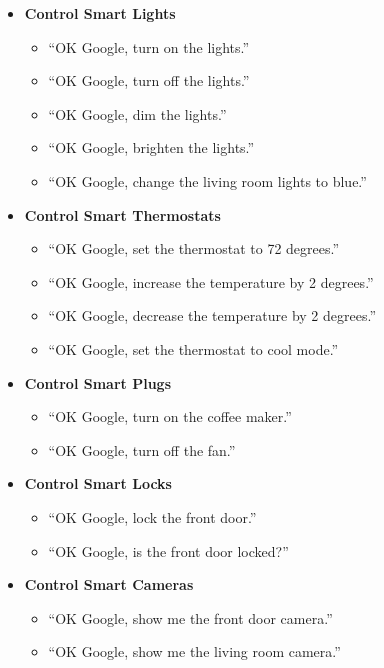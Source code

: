 \documentclass[
  jou,
  floatsintext,
  longtable,
  a4paper,
  nolmodern,
  notxfonts,
  notimes,
  12pt,
  colorlinks=true,linkcolor=blue,citecolor=blue,urlcolor=blue]{apa7}
\providecommand{\tightlist}{%
  \setlength{\itemsep}{0pt}\setlength{\parskip}{0pt}}
\begin{document}
\begin{itemize}
\tightlist
\item
  \textbf{Control Smart Lights}

  \begin{itemize}
  \tightlist
  \item
    ``OK Google, turn on the lights.''
  \item
    ``OK Google, turn off the lights.''
  \item
    ``OK Google, dim the lights.''
  \item
    ``OK Google, brighten the lights.''
  \item
    ``OK Google, change the living room lights to blue.''
  \end{itemize}
\item
  \textbf{Control Smart Thermostats}

  \begin{itemize}
  \tightlist
  \item
    ``OK Google, set the thermostat to 72 degrees.''
  \item
    ``OK Google, increase the temperature by 2 degrees.''
  \item
    ``OK Google, decrease the temperature by 2 degrees.''
  \item
    ``OK Google, set the thermostat to cool mode.''
  \end{itemize}
\item
  \textbf{Control Smart Plugs}

  \begin{itemize}
  \tightlist
  \item
    ``OK Google, turn on the coffee maker.''
  \item
    ``OK Google, turn off the fan.''
  \end{itemize}
\item
  \textbf{Control Smart Locks}

  \begin{itemize}
  \tightlist
  \item
    ``OK Google, lock the front door.''
  \item
    ``OK Google, is the front door locked?''
  \end{itemize}
\item
  \textbf{Control Smart Cameras}

  \begin{itemize}
  \tightlist
  \item
    ``OK Google, show me the front door camera.''
  \item
    ``OK Google, show me the living room camera.''
  \end{itemize}
\end{itemize}
\end{document}
